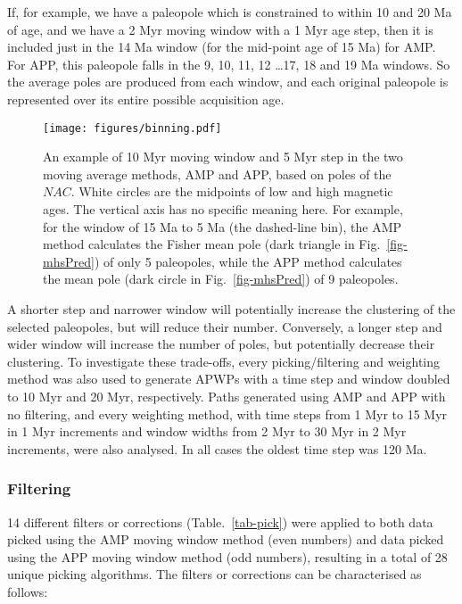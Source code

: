 If, for example, we have a paleopole which is constrained to within 10 and 20 Ma
of age, and we have a 2 Myr moving window with a 1 Myr age step, then it
is included just in the 14 Ma window (for the mid-point age of 15
Ma) for AMP\@. For APP, this paleopole falls in the 9,
10, 11, 12 \ldots 17,
18 and 19 Ma windows. So the average poles are
produced from each window, and each original paleopole is represented over its
entire possible acquisition age.

\begin{figure}
\centering
\texttt{[image: figures/binning.pdf]}
\caption[Moving average (MA) methods]{An example of 10 Myr moving window and 5
Myr step in the two moving average methods, AMP and APP, based on poles of the
$NAC$. White circles are the midpoints of low and high magnetic ages. The
vertical axis has no specific meaning here. For example, for the window of 15 Ma
to 5 Ma (the dashed-line bin), the AMP method calculates the Fisher mean pole
(dark triangle in Fig.~\ref{fig-mhsPred}) of only 5 paleopoles, while the APP
method calculates the mean pole (dark circle in Fig.~\ref{fig-mhsPred}) of 9
paleopoles.}\label{fig-nac-maplat}
\end{figure}

A shorter step and narrower window will potentially increase the clustering of
the selected paleopoles, but will reduce their number. Conversely, a longer step
and wider window will increase the number of poles, but potentially decrease
their clustering. To investigate these trade-offs, every picking/filtering and
weighting method was also used to generate APWPs with a time step and window
doubled to 10 Myr and 20 Myr, respectively. Paths generated using AMP and APP
with no filtering, and every weighting method, with time steps from 1 Myr to 15
Myr in 1 Myr increments and window widths from 2 Myr to 30 Myr in 2 Myr
increments, were also analysed. In all cases the oldest time step was 120 Ma.

\subsubsection{Filtering}

14 different filters or corrections (Table.~\ref{tab-pick}) were applied to both
data picked using the AMP moving window method (even numbers) and data picked
using the APP moving window method (odd numbers), resulting in a total of 28
unique picking algorithms. The filters or corrections can be characterised as
follows:

